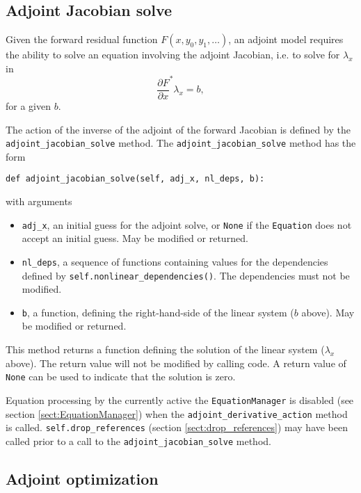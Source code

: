 \documentclass[11pt]{article}
\begin{document}
\subsection{Adjoint Jacobian solve}

Given the forward residual function $F \left( x, y_0, y_1, \ldots \right)$, an
adjoint model requires the ability to solve an equation involving the adjoint
Jacobian, i.e. to solve for $\lambda_x$ in
\begin{equation*}
  \frac{\partial F}{\partial x}^* \lambda_x = b,
\end{equation*}
for a given $b$.

The action of the inverse of the adjoint of the forward Jacobian is defined by
the \texttt{adjoint\_jacobian\_solve} method. The
\texttt{adjoint\_jacobian\_solve} method has the form
\begin{lstlisting}
def adjoint_jacobian_solve(self, adj_x, nl_deps, b):
\end{lstlisting}
with arguments
\begin{itemize}
  \item \texttt{adj\_x}, an initial guess for the adjoint solve, or
    \texttt{None} if the \texttt{Equation} does not accept an initial guess.
    May be modified or returned.
  \item \texttt{nl\_deps}, a sequence of functions containing values for the
    dependencies defined by \texttt{self.nonlinear\_dependencies()}. The
    dependencies must not be modified.
  \item \texttt{b}, a function, defining the right-hand-side of the linear
    system ($b$ above). May be modified or returned.
\end{itemize}
This method returns a function defining the solution of the linear system
($\lambda_x$ above). The return value will not be modified by calling code. A
return value of \texttt{None} can be used to indicate that the solution is
zero.

Equation processing by the currently active the \texttt{EquationManager} is
disabled (see section \ref{sect:EquationManager}) when the
\texttt{adjoint\_derivative\_action} method is called.
\texttt{self.drop\_references} (section \ref{sect:drop_references}) may have
been called prior to a call to the \texttt{adjoint\_jacobian\_solve} method.

\subsection{Adjoint optimization}
\end{document}
